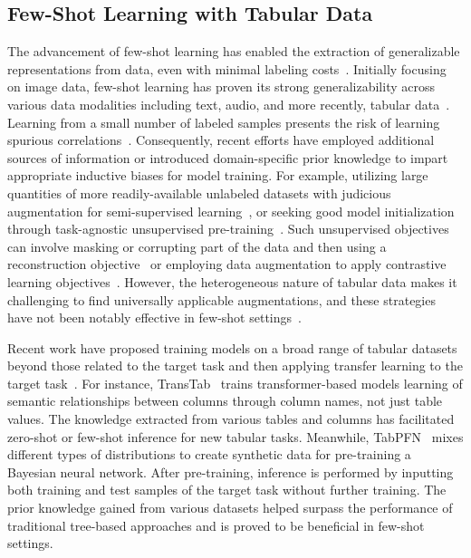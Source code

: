 \documentclass{article}
\theoremstyle{plain}
\theoremstyle{definition}
\theoremstyle{remark}
\begin{document}
\subsection{Few-Shot Learning with Tabular Data}
The advancement of few-shot learning has enabled the extraction of generalizable representations from data, even with minimal labeling costs~\cite{chen2018closer}. Initially focusing on image data, few-shot learning has proven its strong generalizability across various data modalities including text, audio, and more recently, tabular data~\cite{majumder2022few,nam2023stunt,schick2021exploiting}. Learning from a small number of labeled samples presents the risk of learning spurious correlations~\cite{bartlett2021deep}. Consequently, recent efforts have employed additional sources of information or introduced domain-specific prior knowledge to impart appropriate inductive biases for model training. For example, utilizing large quantities of more readily-available unlabeled datasets with judicious augmentation for semi-supervised learning~\cite{ucar2021subtab,yoon2020vime}, or seeking good model initialization through task-agnostic unsupervised pre-training~\cite{somepalli2021saint}. Such unsupervised objectives can involve masking or corrupting part of the data and then using a reconstruction objective~\cite{arik2021tabnet,majmundar2022met} or employing data augmentation to apply contrastive learning objectives~\cite{bahri2022scarf,chen2020simple}. However, the heterogeneous nature of tabular data makes it challenging to find universally applicable augmentations, and these strategies have not been notably effective in few-shot settings~\cite{nam2023stunt}. 

Recent work have proposed training models on a broad range of tabular datasets beyond those related to the target task and then applying transfer learning to the target task~\cite{zhang2023generative,levin2022transfer,zhu2023xtab}. For instance, TransTab~\cite{wang2022transtab} trains transformer-based models learning of semantic relationships between columns through column names, not just table values. The knowledge extracted from various tables and columns has facilitated zero-shot or few-shot inference for new tabular tasks. Meanwhile, TabPFN~\cite{hollmann2022tabpfn} mixes different types of distributions to create synthetic data for pre-training a Bayesian neural network. After pre-training, inference is performed by inputting both training and test samples of the target task without further training. The prior knowledge gained from various datasets helped surpass the performance of traditional tree-based approaches and is proved to be beneficial in few-shot settings.
\end{document}
